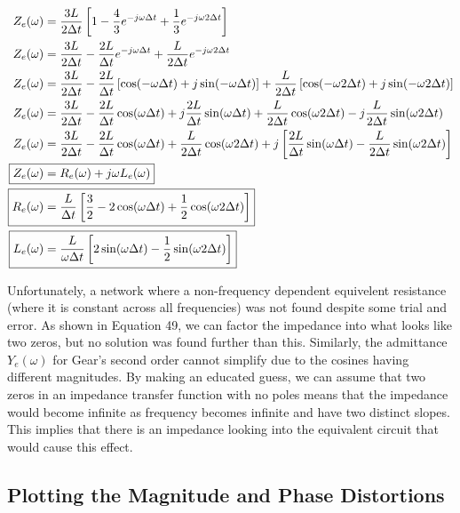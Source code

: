 \documentclass[10pt, oneside, letterpaper]{article}
\begin{document}
\begin{alignat}{2}
Z_e(\omega{}) &= \frac{3L}{2\Delta{}t}\left[1 - \frac{4}{3}e^{-j\omega{}\Delta{}t} + \frac{1}{3}e^{-j\omega{}2\Delta{}t}\right] \\
Z_e(\omega{}) &= \frac{3L}{2\Delta{}t} - \frac{2L}{\Delta{}t}e^{-j\omega{}\Delta{}t} + \frac{L}{2\Delta{}t}e^{-j\omega{}2\Delta{}t} \\
Z_e(\omega{}) &= \frac{3L}{2\Delta{}t} - \frac{2L}{\Delta{}t}\left[\cos(-\omega{}\Delta{}t) + j\sin(-\omega{}\Delta{}t)\right] + \frac{L}{2\Delta{}t}\left[\cos(-\omega{}2\Delta{}t) + j\sin(-\omega{}2\Delta{}t)\right] \\
Z_e(\omega{}) &= \frac{3L}{2\Delta{}t} - \frac{2L}{\Delta{}t}\cos(\omega{}\Delta{}t) + j\frac{2L}{\Delta{}t}\sin(\omega{}\Delta{}t) + \frac{L}{2\Delta{}t}\cos(\omega{}2\Delta{}t) - j\frac{L}{2\Delta{}t}\sin(\omega{}2\Delta{}t) \\
Z_e(\omega{}) &= \frac{3L}{2\Delta{}t} - \frac{2L}{\Delta{}t}\cos(\omega{}\Delta{}t) + \frac{L}{2\Delta{}t}\cos(\omega{}2\Delta{}t) + j\left[\frac{2L}{\Delta{}t}\sin(\omega{}\Delta{}t) - \frac{L}{2\Delta{}t}\sin(\omega{}2\Delta{}t)\right] \\
\Aboxed{Z_e(\omega{}) &= R_e(\omega{}) + j\omega{}L_e(\omega{})} \\
\Aboxed{R_e(\omega{}) &= \frac{L}{\Delta{}t}\left[\frac{3}{2}-2\cos(\omega{}\Delta{}t) + \frac{1}{2}\cos(\omega{}2\Delta{}t)\right]} \\
\Aboxed{L_e(\omega{}) &= \frac{L}{\omega\Delta{}t}\left[2\sin(\omega{}\Delta{}t)-\frac{1}{2}\sin(\omega{}2\Delta{}t)\right]}
\end{alignat}

Unfortunately, a network where a non-frequency dependent equivelent resistance (where it is constant across all frequencies) was not found despite some trial and error. As shown in Equation 49, we can factor the impedance into what looks like two zeros, but no solution was found further than this. Similarly, the admittance $Y_e(\omega{})$ for Gear's second order cannot simplify due to the cosines having different magnitudes. By making an educated guess, we can assume that two zeros in an impedance transfer function with no poles means that the impedance would become infinite as frequency becomes infinite and have two distinct slopes. This implies that there is an impedance looking into the equivalent circuit that would cause this effect.

\subsection{Plotting the Magnitude and Phase Distortions}
\end{document}
